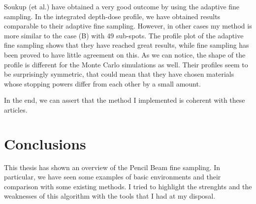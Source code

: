 \documentclass[12pt, a4paper, twoside]{book}
\begin{document}
Soukup (et al.) have obtained a very good outcome by using the adaptive fine sampling. In the integrated depth-dose profile, we have obtained results comparable to their adaptive fine sampling. However, in other cases my method is more similar to the case (B) with 49 sub-spots. The profile plot of the adaptive fine sampling shows that they have reached great results, while fine sampling has been proved to have little agreement on this. As we can notice, the shape of the profile is different for the Monte Carlo simulations as well. Their profiles seem to be surprisingly symmetric, that could mean that they have chosen materials whose stopping powers differ from each other by a small amount. 


In the end, we can assert that the method I implemented is coherent with these articles.


\chapter{Conclusions} %
This thesis has shown an overview of the Pencil Beam fine sampling. In particular, we have seen some examples of basic environments and their comparison with some existing methods. I tried to highlight the strenghts and the weaknesses of this algorithm with the tools that I had at my disposal. %
\end{document}
